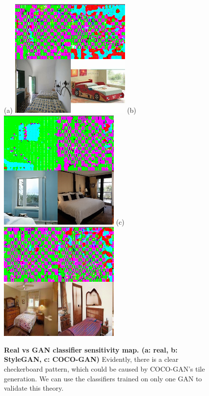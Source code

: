 \documentclass{article}
\begin{document}
        \begin{figure}[H]
          \centering
          (a)
          \includegraphics[scale=0.24]{smoothgrad/combined/real.png}
          (b)
          \includegraphics[scale=0.24]{smoothgrad/combined/stylegan.png}
          (c)
          \includegraphics[scale=0.24]{smoothgrad/combined/coco.png}
          \caption{\textbf{Real vs GAN classifier sensitivity map. (a: real, b: StyleGAN, c: COCO-GAN)} Evidently, there is a clear checkerboard pattern, which could be caused by COCO-GAN's tile generation\cite{cocogan}. 
        We can use the classifiers trained on only one GAN to validate this theory.}
        \end{figure}
\end{document}
